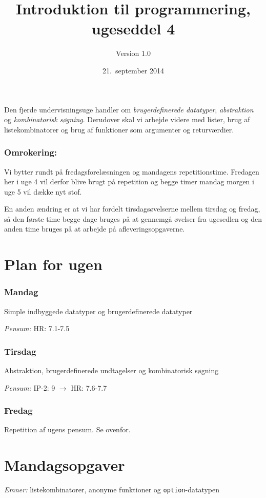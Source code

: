 \documentclass[a4paper,12pt]{article}
\title{Introduktion til programmering, ugeseddel 4}
\author{Version 1.0}%
\date{21.\ september 2014}
\begin{document}
\maketitle{}
Den fjerde undervisningsuge handler om \textit{brugerdefinerede
  datatyper}, \textit{abstraktion} og \textit{kombinatorisk
  søgning}. Derudover skal vi arbejde videre med lister, brug af
listekombinatorer og brug af funktioner som argumenter og
returværdier.


\subsubsection*{Omrokering:}
Vi bytter rundt på fredagsforelæsningen og mandagens
repetitionstime. Fredagen her i uge 4 vil derfor blive brugt på
repetition og begge timer mandag morgen i uge 5 vil dække nyt
stof.

En anden ændring er at vi har fordelt tirsdagsøvelserne mellem tirsdag
og fredag, så den første time begge dage bruges på at gennemgå øvelser
fra ugesedlen og den anden time bruges på at arbejde på
afleveringsopgaverne.

\section{Plan for ugen}
\label{sec:pensum-og-plan}

\subsubsection*{Mandag}
Simple indbyggede datatyper og brugerdefinerede datatyper

\textit{Pensum:} HR: 7.1-7.5

\subsubsection*{Tirsdag}
Abstraktion, brugerdefinerede undtagelser og kombinatorisk søgning

\textit{Pensum:} IP-2: 9 $\rightarrow$ HR: 7.6-7.7

\subsubsection*{Fredag}
Repetition af ugens pensum. Se ovenfor.

\newpage
\section{Mandagsopgaver}
\label{sec:mandagsopgaver}
\textit{Emner:} listekombinatorer, anonyme funktioner og \lstinline{option}-datatypen
\end{document}
